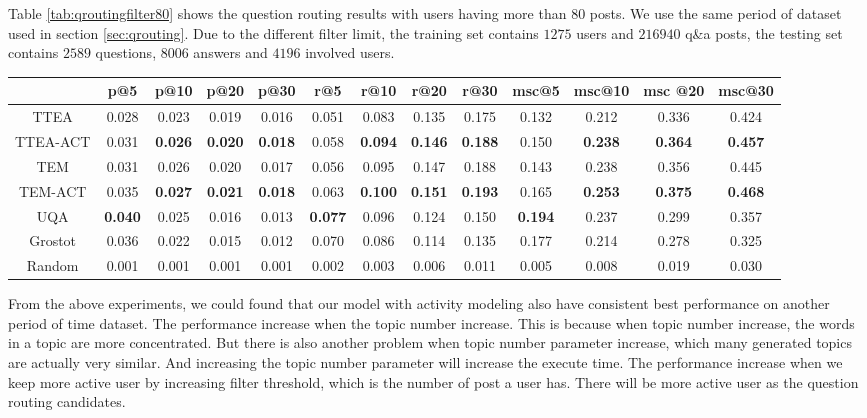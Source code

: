 {{{{{{{Table \ref{tab:qroutingfilter80} shows the question routing results with users having more than 80 posts. We use the same period of dataset used in section \ref{sec:qrouting}. Due to the different filter limit, the training set contains $1275$ users and $216940$ q\&a posts, the testing set contains $2589$ questions, $8006$ answers and $4196$ involved users.
\begin{sidewaystable}
\caption{Question Routing experiments,  with users having more than 80 posts}
\label{tab:qroutingfilter80}
\centering
\begin{tabular}{|c|c|c|c|c|c|c|c|c|c|c|c|c|}
\hline
 & p@5    &p@10    &p@20   & p@30 &r@5 & r@10 & r@20 &r@30 & msc@5 & msc@10 &msc @20 &msc@30  \\ \hline
TTEA&0.028&0.023&0.019&0.016&0.051&0.083&0.135&0.175&0.132&0.212&0.336&0.424 \\ \hline
TTEA-ACT&0.031&\textbf{0.026}&\textbf{0.020}&\textbf{0.018}&0.058&\textbf{0.094}&\textbf{0.146}&\textbf{0.188}&0.150&\textbf{0.238}&\textbf{0.364}&\textbf{0.457} \\ \hline
TEM&0.031&0.026&0.020&0.017&0.056&0.095&0.147&0.188&0.143&0.238&0.356&0.445 \\ \hline
TEM-ACT&0.035&\textbf{0.027}&\textbf{0.021}&\textbf{0.018}&0.063&\textbf{0.100}&\textbf{0.151}&\textbf{0.193}&0.165  &\textbf{0.253}&\textbf{0.375}&\textbf{0.468} \\ \hline
UQA&\textbf{0.040}&0.025&0.016&0.013&\textbf{0.077}&0.096&0.124&0.150&\textbf{0.194}&0.237&0.299&0.357 \\ \hline
Grostot&0.036&0.022&0.015&0.012&0.070&0.086&0.114&0.135&0.177&0.214&0.278&0.325 \\ \hline
Random&0.001&0.001&0.001&0.001&0.002&0.003&0.006&0.011&0.005&0.008&0.019&0.030 \\ \hline
\end{tabular}
\end{sidewaystable}


From the above experiments, we could found that our model with activity modeling also have consistent best performance on another period of time dataset. The performance increase when the topic number increase. This is because when topic number increase, the words in a topic are more concentrated. But there is also another problem when topic number parameter increase, which many generated topics are actually very similar. And increasing the topic number parameter will increase the execute time. The performance increase when we keep more active user by increasing filter threshold, which is the number of post a user has. There will be more active user as the question routing candidates.




}}}}}}}
